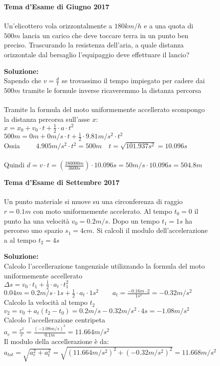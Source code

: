 \begin{figure}[h!]
\textbf{Tema d'Esame di Giugno 2017}\\ \\
Un'elicottero vola orizzontalmente a $180 km/h$ e a una quota di $500 m$ lancia
un carico che deve toccare terra in un punto ben preciso. Trascurando la resistenza
dell’aria, a quale distanza orizzontale dal bersaglio l'equipaggio deve effettuare il
lancio? \\
\begin{boxed}
\textbf{Soluzione:}\\
Sapendo che $v=\frac{d}{t}$ se trovassimo il tempo impiegato per cadere dai $500m$ tramite le formule inverse ricaveremmo la distanza percorsa\\ \\
Tramite la formula del moto uniformemente accellerato scompongo la distanza percorsa sull'asse $x$:\\
$x=x_0 + v_0\cdot t + \frac{1}{2}\cdot a \cdot t^2 $\\
$500m= 0m + 0m/s\cdot t + \frac{1}{2}\cdot 9.81m/s^2\cdot t^2 \qquad$ \\
Ossia $\qquad 4.905m/s^2\cdot t^2=500m \quad t=\sqrt{101.937s^2}=10.096s $\\ \\
Quindi $d=v\cdot t=(\frac{180 000m}{3 600s})\cdot 10.096s=50m/s\cdot 10.096s=504.8m$
\end{boxed}
\end{figure}


\begin{figure}[h!]
\textbf{Tema d'Esame di Settembre 2017}\\ \\
Un punto materiale si muove su una circonferenza di raggio $r = 0.1 m$ con moto
uniformemente accelerato. Al tempo $t_0 = 0$ il punto ha una velocità $v_0 = 0.2 m/s$.
Dopo un tempo $t_1 = 1 s$ ha percorso uno spazio $s_1 = 4 cm$. Si calcoli il modulo
dell’accelerazione a al tempo $t_2 = 4 s$
\begin{boxed}
\textbf{Soluzione:}\\
Calcolo l'accellerazione tangenziale utilizzando la formula del moto uniformemente accellerato\\
$\Delta s=v_0\cdot t_1+\frac{1}{2}\cdot a_t\cdot t_1^2$\\
$0.04m=0.2m/s\cdot 1s +\frac{1}{2}\cdot a_t \cdot 1s^2 \qquad a_t=\frac{-0.16m\cdot 2}{1s^2}=-0.32m/s^2$\\
Calcolo la velocità al tempo $t_2$\\
$v_2=v_0+a_t(t_2-t_0)=0.2m/s-0.32m/s^2\cdot 4s=-1.08m/s^2 $\\
Calcolo l'accellerazione centripeta\\
$a_c=\frac{v^2}{r}=\frac{(-1.08m/s)^2}{0.1m}=11.664m/s^2$\\
Il modulo della accellerazione è da:\\
$a_{tot}=\sqrt{a_c^2+a_t^2}=\sqrt{(11.664m/s^2)^2+(-0.32m/s^2)^2}=11.668m/s^2$
\end{boxed}
\end{figure}

